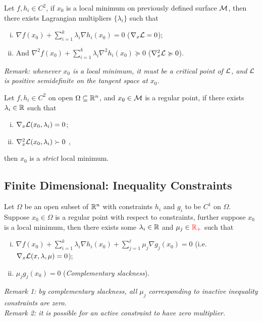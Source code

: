 \documentclass{article}
\begin{document}
    \begin{theorem}
        Let $f, h_i \in C^2$, if $x_0$ is a local minimum on previously defined surface $\mathcal{{M}}$, then there exists Lagrangian multipliers $\{\lambda_i\}$ such that
        \begin{enumerate}[(i)]
            \item $\nabla f(x_0) + \sum_{i=1}^k \lambda_i \nabla h_i(x_0) = 0$ ($\nabla_x \mathcal{{L}} = 0$);
            \item And $\nabla^2 f(x_0) + \sum_{i=1}^k \lambda_i \nabla^2 h_i(x_0) \succcurlyeq 0$  ($\nabla_x^2 \mathcal{{L}} \succcurlyeq 0$).
        \end{enumerate}
        \emph{Remark: whenever $x_0$ is a local minimum, it must be a critical point of $\mathcal{{L}}$, and $\mathcal{{L}}$ is positive semidefinite on the tangent space at $x_0$.}
    \end{theorem}

    \begin{theorem}
        Let $f, h_i \in C^2$ on open $\Omega \subseteq \mathbb{R}^n$, and $x_0 \in \mathcal{{M}}$ is a regular point, if there exists $\lambda_i \in \mathbb{R}$ such that
        \begin{enumerate}[(i)]
            \item $\nabla_x \mathcal{{L}}(x_0, \lambda_i) = 0$;
            \item $\nabla_x^2 \mathcal{{L}}(x_0, \lambda_i) \succ 0$ ,
        \end{enumerate}
        then $x_0$ is a \emph{strict} local minimum.
    \end{theorem}

\subsection{Finite Dimensional: Inequality Constraints}
    \begin{theorem}
        Let $\Omega$ be an open subset of $\mathbb{R}^n$ with constraints $h_i$ and $g_i$ to be $C^1$ on $\Omega$. Suppose $x_0 \in \Omega$ is a regular point with respect to constraints, further suppose $x_0$ is a local minimum, then there exists some $\lambda_i \in \mathbb{R}$ and $\mu_j \in \textcolor{red}{\mathbb{R}_+}$ such that 
        \begin{enumerate}[(i)]
            \item $\nabla f(x_0) + \sum_{i=1}^k \lambda_i \nabla h_i(x_0) + \sum_{j=1}^\ell \mu_j \nabla g_j(x_0) = 0$ (i.e. $\nabla_x \mathcal{{L}}(x, \lambda, \mu) = 0$);
            \item $\mu_j g_j(x_0) = 0$ (\emph{Complementary slackness}).
        \end{enumerate}
        \emph{Remark 1: by complementary slackness, all $\mu_j$ corresponding to inactive inequality constraints are zero.} \\
        \emph{Remark 2: it is possible for an active constraint to have zero multiplier.}
    \end{theorem}
\end{document}
